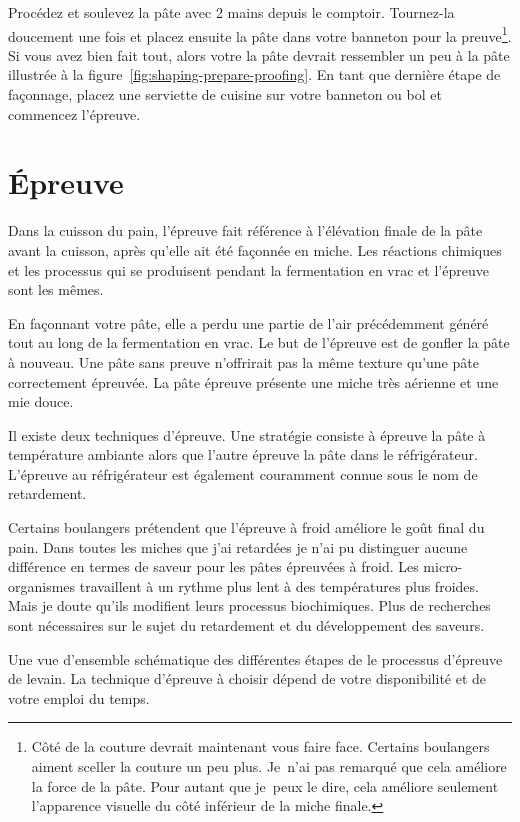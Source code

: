 Procédez et soulevez la pâte avec 2 mains depuis le comptoir.
Tournez-la doucement une fois et placez ensuite la pâte dans votre
banneton pour la preuve\footnote{Côté de la couture devrait maintenant vous faire face.
Certains boulangers aiment sceller la couture un peu plus. Je~n’ai
pas remarqué que cela améliore la force de la pâte. Pour autant que je~peux
le dire, cela améliore seulement l'apparence visuelle du côté inférieur
de la miche finale.}. Si vous avez bien fait tout, alors votre
la pâte devrait ressembler un peu à la pâte illustrée à la figure~\ref{fig:shaping-prepare-proofing}.
En tant que dernière étape de façonnage, placez une serviette de cuisine sur votre banneton
ou bol et commencez l'épreuve.

\section{Épreuve}

Dans la cuisson du pain, l'épreuve fait référence à l'élévation finale de la pâte avant la cuisson,
après qu'elle ait été façonnée en miche. Les réactions chimiques et les processus
qui se produisent pendant la fermentation en vrac et l'épreuve sont les mêmes.

En façonnant votre pâte, elle a perdu une partie de l'air précédemment généré
tout au long de la fermentation en vrac. Le but de l'épreuve est de gonfler
la pâte à nouveau. Une pâte sans preuve n'offrirait pas la même texture
qu'une pâte correctement épreuvée. La pâte épreuve présente une miche très aérienne
et une mie douce.

Il existe deux techniques d'épreuve. Une stratégie consiste à épreuve la pâte
à température ambiante alors que l'autre épreuve la pâte dans le réfrigérateur.
L'épreuve au réfrigérateur est également couramment connue sous le nom de retardement.

Certains boulangers prétendent que l'épreuve à froid améliore le goût final du pain.
Dans toutes les miches que j'ai retardées je n'ai pu distinguer aucune différence
en termes de saveur pour les pâtes épreuvées à froid. Les micro-organismes travaillent
à un rythme plus lent à des températures plus froides. Mais je doute qu'ils modifient
leurs processus biochimiques. Plus de recherches sont nécessaires sur le sujet
du retardement et du développement des saveurs.

\begin{flowchart}[!htb]
\begin{center}
  
  \caption[Processus de preuve]{Une vue d'ensemble schématique des différentes étapes de
      le processus d'épreuve de levain. La technique d'épreuve à choisir dépend
      de votre disponibilité et de votre emploi du temps.}%
  \label{fig:proofing-process}
\end{center}
\end{flowchart}

